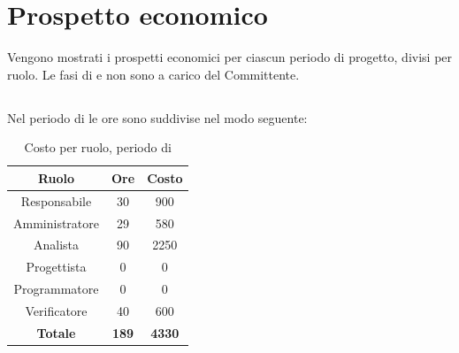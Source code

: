 \section{Prospetto economico}
Vengono mostrati i prospetti economici per ciascun periodo di progetto, divisi per ruolo. Le fasi di \AR{} e \AD{} non sono a carico del Committente.

\subsection{\AR}
Nel periodo di \AR{} le ore sono suddivise nel modo seguente:
\begin{table}[H]
	\centering
	\begin{tabular}{|c|c|c|}
		\hline
		\textbf{Ruolo} &
		\textbf{Ore} &
		\textbf{Costo} \\
		\hline
		Responsabile & 30 & 900\\
		\hline
		Amministratore & 29 & 580\\
		\hline
		Analista & 90 & 2250\\
		\hline
		Progettista & 0 & 0 \\
		\hline
		Programmatore & 0 & 0 \\
		\hline
		Verificatore & 40 & 600\\
		\hline
		\textbf{Totale} & \textbf{189} & \textbf{4330} \\
		\hline
	\end{tabular}
	\caption{Costo per ruolo, periodo di \AR}
\end{table}

